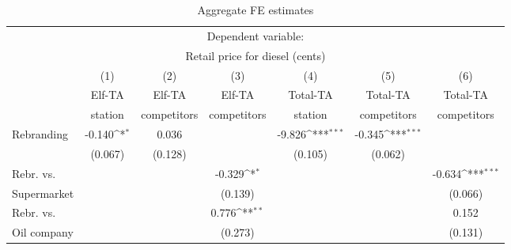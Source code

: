 \documentclass[11pt]{article}
\begin{document}
\begin{table}[h]
\centering
\def\sym#1{\ifmmode^{#1}\else\(^{#1}\)\fi}
\caption{Aggregate FE estimates}
\begin{tabular}{lcccccc}
\toprule
\toprule
\multicolumn{7}{c}{Dependent variable:}\\
\multicolumn{7}{c}{Retail price for diesel (cents)}\\
\hline
{}                      & (1)                            & (2)                        & (3)                           & (4)                              & (5)                               & (6)                   \\
{}                      & Elf-TA                        & Elf-TA                    & Elf-TA                      & Total-TA                       & Total-TA                      & Total-TA                   \\
{}                      & station                      & competitors          & competitors             & station                        & competitors                & competitors              \\
\hline
Rebranding       & -0.140\sym{*}         & 0.036                    &                                 & -9.826\sym{***}       & -0.345\sym{***}      &                                  \\
                         & (0.067)                     & (0.128)                  &                                & (0.105)                       & (0.062)                      &                                  \\
\hline
Rebr. vs.           &                                  &                               & -0.329\sym{*}      &                                    &                                     & -0.634\sym{***}     \\
Supermarket     &                                  &                               & (0.139)                  &                                    &                                     & (0.066)                    \\
\hline
Rebr. vs.           &                                  &                               & 0.776\sym{**}      &                                    &                                   &  0.152                        \\
Oil company      &                                  &                                & (0.273)                 &                                    &                                    &  (0.131)                      \\

\end{tabular}
\end{table}
\end{document}
